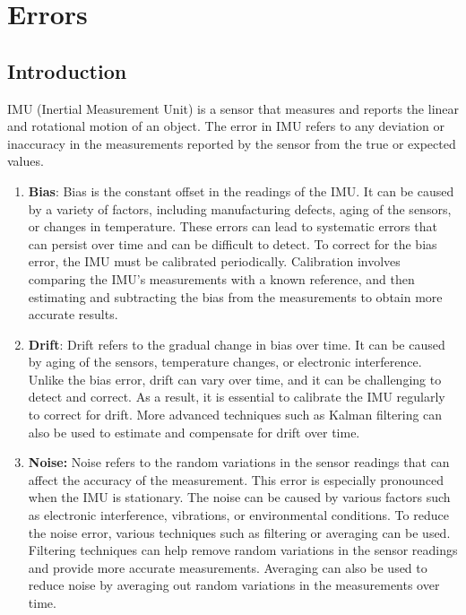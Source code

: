 %
%


\chapter{Errors}  \label{Chap: Errors}

\section{Introduction}

IMU (Inertial Measurement Unit) is a sensor that measures and reports the linear and rotational motion of an object. The error in IMU refers to any deviation or inaccuracy in the measurements reported by the sensor from the true or expected values.

\bigskip


\begin{enumerate}
    \item\textbf{Bias}: Bias is the constant offset in the readings of the IMU. It can be caused by a variety of factors, including manufacturing defects, aging of the sensors, or changes in temperature. These errors can lead to systematic errors that can persist over time and can be difficult to detect. To correct for the bias error, the IMU must be calibrated periodically. Calibration involves comparing the IMU's measurements with a known reference, and then estimating and subtracting the bias from the measurements to obtain more accurate results.\cite{sabatini:2011}

    \item \textbf{Drift}: Drift refers to the gradual change in bias over time. It can be caused by aging of the sensors, temperature changes, or electronic interference. Unlike the bias error, drift can vary over time, and it can be challenging to detect and correct. As a result, it is essential to calibrate the IMU regularly to correct for drift. More advanced techniques such as Kalman filtering can also be used to estimate and compensate for drift over time.\cite{Tedaldi:2014}

    \item \textbf{Noise:} Noise refers to the random variations in the sensor readings that can affect the accuracy of the measurement. This error is especially pronounced when the IMU is stationary. The noise can be caused by various factors such as electronic interference, vibrations, or environmental conditions. To reduce the noise error, various techniques such as filtering or averaging can be used. Filtering techniques can help remove random variations in the sensor readings and provide more accurate measurements. Averaging can also be used to reduce noise by averaging out random variations in the measurements over time.\cite{Faragher:2014}
\end{enumerate}

